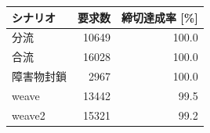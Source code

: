 \begin{tabular}{lrr}
\hline \hline
シナリオ & 要求数 & 締切達成率 [\%] \\
\hline
分流 & 10649 & 100.0 \\
合流 & 16028 & 100.0 \\
障害物封鎖 & 2967 & 100.0 \\
weave & 13442 & 99.5 \\
weave2 & 15321 & 99.2 \\
\hline
\end{tabular}
